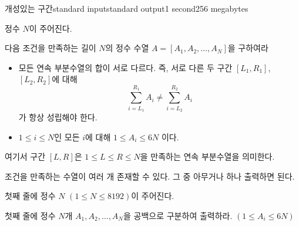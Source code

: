 \begin{problem}{개성있는 구간}{standard input}{standard output}{1 second}{256 megabytes}

정수 $N$이 주어진다.


다음 조건을 만족하는 길이 $N$의 정수 수열 $A = [A_1, A_2, \dots, A_N]$을 구하여라

\begin{itemize}
    \item 모든 연속 부분수열의 합이 서로 다르다.  
    즉, 서로 다른 두 구간 $[L_1, R_1]$, $[L_2, R_2]$에 대해
    $$
    \sum_{i=L_1}^{R_1} A_i \ne \sum_{i=L_2}^{R_2} A_i
    $$
    가 항상 성립해야 한다.
    \item $1 \le i \le N$인 모든 $i$에 대해 $1 \le A_i \le 6N$ 이다.
\end{itemize}

여기서 구간 $[L, R]$은 $1 \le L \le R \le N$을 만족하는 연속 부분수열을 의미한다.

조건을 만족하는 수열이 여러 개 존재할 수 있다. 그 중 아무거나 하나 출력하면 된다.

\InputFile
첫째 줄에 정수 $N$ $(1 \le N \le 8192)$이 주어진다.

\OutputFile
첫째 줄에 정수 $N$개 $A_1, A_2, \dots, A_N$을 공백으로 구분하여 출력하라.
$(1 \le A_i \le 6N)$


\Example

\begin{example}
%
\end{example}

\end{problem}

